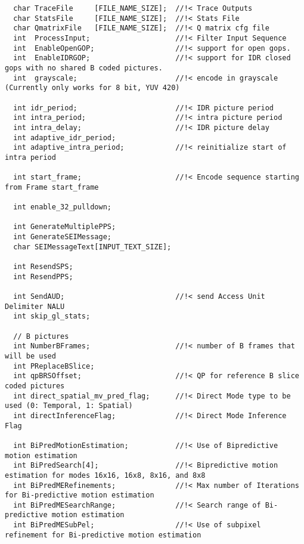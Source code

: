 \begin{lstlisting}
  char TraceFile     [FILE_NAME_SIZE];  //!< Trace Outputs
  char StatsFile     [FILE_NAME_SIZE];  //!< Stats File
  char QmatrixFile   [FILE_NAME_SIZE];  //!< Q matrix cfg file
  int  ProcessInput;                    //!< Filter Input Sequence
  int  EnableOpenGOP;                   //!< support for open gops.
  int  EnableIDRGOP;                    //!< support for IDR closed gops with no shared B coded pictures.
  int  grayscale;                       //!< encode in grayscale (Currently only works for 8 bit, YUV 420)

  int idr_period;                       //!< IDR picture period
  int intra_period;                     //!< intra picture period
  int intra_delay;                      //!< IDR picture delay
  int adaptive_idr_period;
  int adaptive_intra_period;            //!< reinitialize start of intra period

  int start_frame;                      //!< Encode sequence starting from Frame start_frame

  int enable_32_pulldown;

  int GenerateMultiplePPS;
  int GenerateSEIMessage;
  char SEIMessageText[INPUT_TEXT_SIZE];

  int ResendSPS;
  int ResendPPS;

  int SendAUD;                          //!< send Access Unit Delimiter NALU
  int skip_gl_stats; 

  // B pictures
  int NumberBFrames;                    //!< number of B frames that will be used
  int PReplaceBSlice;
  int qpBRSOffset;                      //!< QP for reference B slice coded pictures
  int direct_spatial_mv_pred_flag;      //!< Direct Mode type to be used (0: Temporal, 1: Spatial)
  int directInferenceFlag;              //!< Direct Mode Inference Flag

  int BiPredMotionEstimation;           //!< Use of Bipredictive motion estimation
  int BiPredSearch[4];                  //!< Bipredictive motion estimation for modes 16x16, 16x8, 8x16, and 8x8  
  int BiPredMERefinements;              //!< Max number of Iterations for Bi-predictive motion estimation
  int BiPredMESearchRange;              //!< Search range of Bi-predictive motion estimation
  int BiPredMESubPel;                   //!< Use of subpixel refinement for Bi-predictive motion estimation


\end{lstlisting}
